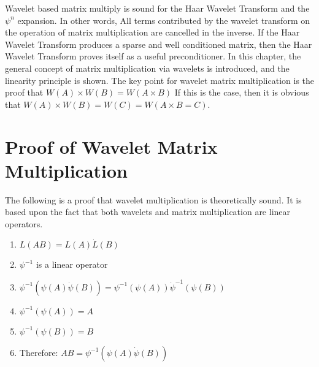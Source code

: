 Wavelet based matrix multiply is sound for the Haar Wavelet Transform and the $\psi^n$ expansion.   In other words, All terms contributed by the wavelet transform on the operation of matrix multiplication are cancelled in the inverse.
If the Haar Wavelet Transform produces a sparse and well conditioned matrix, then the Haar Wavelet Transform proves itself as a useful preconditioner.  %
In this chapter, the general concept of matrix multiplication via wavelets is introduced, and the linearity principle is shown.  
The key point for wavelet matrix multiplication is the proof that $W(A) \times W(B) = W(A\times B)$  If this is the case, then it is obvious that $W(A) \times W(B) = W(C) = W(A\times B = C)$.  %

\section { Proof of Wavelet Matrix Multiplication}
The following is a proof that wavelet multiplication is theoretically sound. It is based upon the fact that both wavelets and matrix multiplication  are linear operators.

\begin{enumerate}
\item $L(AB) = L(A) \dot L(B)$
\item $\psi ^{-1}$ is a linear operator
\item $\psi ^{-1} (\psi (A) \dot \psi (B)) = \psi ^ {-1} (\psi (A)) \dot \psi ^{-1} (\psi(B)) $
\item $\psi ^{-1}(\psi(A)) = A$
\item $\psi ^{-1}(\psi(B)) = B$
\item Therefore:  $AB = \psi^{-1} (\psi(A) \dot \psi(B))$  
\end{enumerate}

